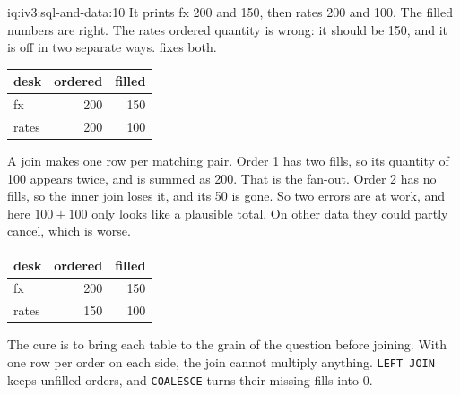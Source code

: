 \begin{solution}{iq:iv3:sql-and-data:10}
It prints fx 200 and 150, then rates 200 and 100. The filled numbers are right. The rates ordered quantity is wrong: it should be 150, and it is off in two separate ways.  fixes both.
\begin{center}\small
\begin{tabular}{lrr}
desk & ordered & filled\\\hline
fx & 200 & 150\\
rates & 200 & 100
\end{tabular}
\end{center}
A join makes one row per matching pair. Order 1 has two fills, so its quantity of 100 appears twice, and is summed as 200. That is the fan-out. Order 2 has no fills, so the inner join loses it, and its 50 is gone. So two errors are at work, and here $100 + 100$ only looks like a plausible total. On other data they could partly cancel, which is worse.
\label{lst:iv3:sq:fanoutfixed}
\begin{center}\small
\begin{tabular}{lrr}
desk & ordered & filled\\\hline
fx & 200 & 150\\
rates & 150 & 100
\end{tabular}
\end{center}
The cure is to bring each table to the grain of the question before joining. With one row per order on each side, the join cannot multiply anything. \texttt{LEFT JOIN} keeps unfilled orders, and \texttt{COALESCE} turns their missing fills into 0.

\end{solution}

